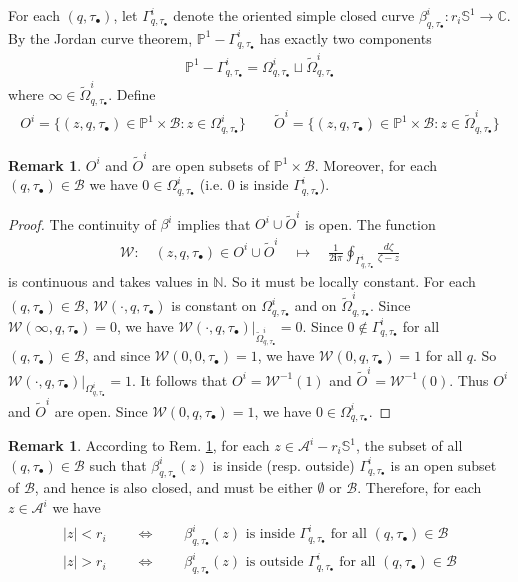 \documentclass[11pt,b5paper,notitlepage]{article}
\theoremstyle{definition}
\newtheorem{rem}[df]{Remark}
\theoremstyle{plain}
\newcommand{\mc}{\mathcal}
\newcommand{\wtd}{\widetilde}
\newcommand{\Sbb}{\mathbb{S}}
\newcommand{\im}{\mathbf{i}}
\newcommand{\blt}{\bullet}
\newcommand{\Cbb}{\mathbb C}
\newcommand{\Nbb}{\mathbb N}
\newcommand{\Pbb}{\mathbb P}
\newcommand{\<}{\left\langle}
\renewcommand{\>}{\right\rangle}
\newcommand{\MB}{\mathcal{B}}
\numberwithin{equation}{section}
\begin{document}
For each $(q,\tau_\blt)$, let $\Gamma^i_{q,\tau_\blt}$ denote the oriented simple closed curve $\beta^i_{q,\tau_\blt}:r_i\Sbb^1\rightarrow\Cbb$. By the Jordan curve theorem, $\Pbb^1-\Gamma^i_{q,\tau_\blt}$ has exactly two components
\begin{align*}
\Pbb^1-\Gamma^i_{q,\tau_\blt}=\Omega^i_{q,\tau_\blt}\sqcup\wtd\Omega^i_{q,\tau_\blt}
\end{align*}
where $\infty\in\wtd\Omega^i_{q,\tau_\blt}$. Define
\begin{align}
O^i=\{(z,q,\tau_\blt)\in\Pbb^1\times\MB:z\in\Omega^i_{q,\tau_\blt}\}\qquad \wtd O^i=\{(z,q,\tau_\blt)\in\Pbb^1\times\MB:z\in\wtd\Omega^i_{q,\tau_\blt}\}
\end{align}

\begin{rem}\label{lbb29}
$O^i$ and $\wtd O^i$ are open subsets of $\Pbb^1\times\MB$. Moreover,  for each $(q,\tau_\blt)\in\MB$ we have $0\in\Omega_{q,\tau_\blt}^i$ (i.e. $0$ is inside $\Gamma^i_{q,\tau_\blt}$).
\end{rem}

\begin{proof}
The continuity of $\beta^i$ implies that $O^i\cup \wtd O^i$ is open. The function
\begin{align*}
\mc W:\quad (z,q,\tau_\blt)\in O^i\cup \wtd O^i\quad\mapsto\quad \frac 1{2\im\pi}\oint\nolimits_{\Gamma^i_{q,\tau_\blt}}\frac {d\zeta}{\zeta-z}
\end{align*}
is continuous and takes values in $\Nbb$. So it must be locally constant. For each $(q,\tau_\blt)\in\MB$, $\mc W(\cdot,q,\tau_\blt)$ is constant on $\Omega^i_{q,\tau_\blt}$ and on $\wtd\Omega^i_{q,\tau_\blt}$. Since $\mc W(\infty,q,\tau_\blt)=0$, we have $\mc W(\cdot,q,\tau_\blt)|_{\wtd\Omega^i_{q,\tau_\blt}}=0$. Since $0\notin\Gamma^i_{q,\tau_\blt}$ for all $(q,\tau_\blt)\in\MB$, and since $\mc W(0,0,\tau_\blt)=1$, we have $\mc W(0,q,\tau_\blt)=1$ for all $q$. So $\mc W(\cdot,q,\tau_\blt)|_{\Omega^i_{q,\tau_\blt}}=1$. It follows that $O^i=\mc W^{-1}(1)$ and $\wtd O^i=\mc W^{-1}(0)$. Thus $O^i$ and $\wtd O^i$ are open. Since $\mc W(0,q,\tau_\blt)=1$, we have $0\in\Omega_{q,\tau_\blt}^i$.
\end{proof}

\begin{rem}
According to Rem. \ref{lbb29}, for each $z\in\mc A^i-r_i\Sbb^1$, the subset of all $(q,\tau_\blt)\in\MB$ such that $\beta^i_{q,\tau_\blt}(z)$ is inside (resp. outside) $\Gamma^i_{q,\tau_\blt}$ is an open subset of $\MB$, and hence is also closed, and must be either $\emptyset$ or $\MB$. Therefore, for each $z\in\mc A^i$ we have
\begin{gather}\label{eqb61}
\begin{gathered}
|z|<r_i\qquad\Longleftrightarrow\qquad \beta^i_{q,\tau_\blt}(z)\text{ is inside $\Gamma^i_{q,\tau_\blt}$ for all }(q,\tau_\blt)\in\MB\\
|z|>r_i\qquad\Longleftrightarrow\qquad \beta^i_{q,\tau_\blt}(z)\text{ is outside $\Gamma^i_{q,\tau_\blt}$ for all }(q,\tau_\blt)\in\MB
\end{gathered}
\end{gather}
\end{rem}
\end{document}
